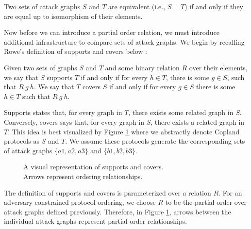 \documentclass[runningheads]{llncs}
\theoremstyle{definition}
\begin{document}
\begin{definition}[Equivalence =]
    Two sets of attack graphs $S$ and $T$ are equivalent (i.e., $S = T$) if and only if they are equal up to isomorphism of their elements.
\end{definition}

Now before we can introduce a partial order relation, we must introduce additional infrastructure to compare sets of attack graphs. We begin by recalling Rowe's definition of supports and covers below \cite{Rowe:2021:OnOrdering}:

\begin{definition}
    Given two sets of graphs $S$ and $T$ and some binary relation $R$ over their elements, we say that $S$ supports $T$ if and only if for every $h \in T$, there is some $g \in S$, such that $R\: g\: h$. We  say that $T$ covers $S$ if and only if for every $g \in S$ there is some $h \in T$ such that $R\: g\: h$.
\end{definition}

Supports states that, for every graph in $T$, there exists some related graph in $S$. Conversely, covers says that, for every graph in $S$, there exists a related graph in $T$.  This idea is best visualized by Figure \ref{fig:sup-cov} where we abstractly denote Copland protocols as $S$ and $T$. We assume these protocols generate the corresponding sets of attack graphs $\{a1, a2 , a3 \}$ and $ \{b1, b2 ,b3\}$.

\begin{figure}[htbp]
    \centering
    
    \captionsetup{justification=centering,margin=1cm}
    \caption[Supports and covers]{A visual representation of supports and covers. \\ Arrows represent ordering relationships.}
    \label{fig:sup-cov}
\end{figure}

The definition of supports and covers is parameterized over a relation $R$. For an adversary-constrained protocol ordering, we choose $R$ to be the partial order over attack graphs defined previously. Therefore, in Figure \ref{fig:sup-cov}, arrows between the individual attack graphs represent partial order relationships.
\end{document}
